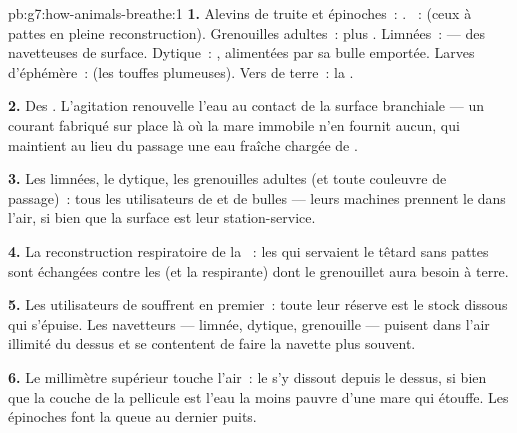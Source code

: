 \begin{solution}{pb:g7:how-animals-breathe:1}
\textbf{1.} Alevins de truite et épinoches~: . ~:
 (ceux à pattes en pleine reconstruction). Grenouilles
adultes~:  plus . Limnées~:  --- des navetteuses
de surface. Dytique~: , alimentées par sa bulle emportée.
Larves d'éphémère~:  (les touffes plumeuses). Vers de
terre~: la .

\textbf{2.} Des . L'agitation renouvelle l'eau au contact
de la surface branchiale --- un courant fabriqué sur place là où la
mare immobile n'en fournit aucun, qui maintient au lieu du passage
une eau fraîche chargée de .

\textbf{3.} Les limnées, le dytique, les grenouilles adultes (et
toute couleuvre de passage)~: tous les utilisateurs de  et de
bulles --- leurs machines prennent le  dans l'air, si bien
que la surface est leur station-service.

\textbf{4.} La reconstruction respiratoire de la ~: les
 qui servaient le têtard sans pattes sont échangées contre
les  (et la  respirante) dont le grenouillet aura besoin
à terre.

\textbf{5.} Les utilisateurs de  souffrent en premier~:
toute leur réserve est le stock dissous qui s'épuise. Les
navetteurs --- limnée, dytique, grenouille --- puisent dans l'air
illimité du dessus et se contentent de faire la navette plus
souvent.

\textbf{6.} Le millimètre supérieur touche l'air~: le  s'y
dissout depuis le dessus, si bien que la couche de la pellicule est
l'eau la moins pauvre d'une mare qui étouffe. Les épinoches font la
queue au dernier puits.


\end{solution}
